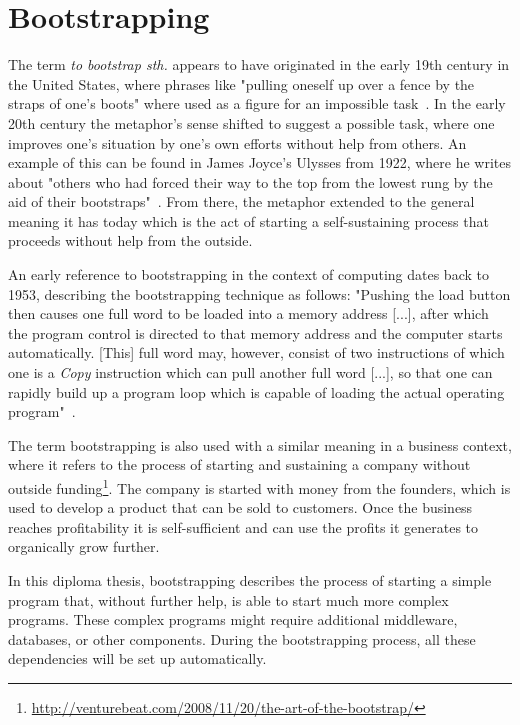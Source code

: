 \section{Bootstrapping}
\label{fundamentals:bootstrapping}

The term \textit{to bootstrap sth.} appears to have originated in the early 19th century in the United States, where phrases like "pulling oneself up over a fence by the straps of one's boots" where used as a figure for an impossible task~\autocite{bootstrap:history}.
In the early 20th century the metaphor's sense shifted to suggest a possible task, where one improves one's situation by one's own efforts without help from others.
An example of this can be found in James Joyce's Ulysses from 1922, where he writes about "others who had forced their way to the top from the lowest rung by the aid of their bootstraps"~\autocite{bootstrap:ulysses}.
From there, the metaphor extended to the general meaning it has today which is the act of starting a self-sustaining process that proceeds without help from the outside.

An early reference to bootstrapping in the context of computing dates back to 1953, describing the bootstrapping technique as follows: "Pushing the load button then causes one full word to be loaded into a memory address [...], after which the program control is directed to that memory address and the computer starts automatically. [This] full word may, however, consist of two instructions of which one is a \textit{Copy} instruction which can pull another full word [...], so that one can rapidly build up a program loop which is capable of loading the actual operating program"~\autocite{bootstrap:early}.

The term bootstrapping is also used with a similar meaning in a business context, where it refers to the process of starting and sustaining a company without outside funding\footnote{\url{http://venturebeat.com/2008/11/20/the-art-of-the-bootstrap/}}.
The company is started with money from the founders, which is used to develop a product that can be sold to customers.
Once the business reaches profitability it is self-sufficient and can use the profits it generates to organically grow further.

In this diploma thesis, bootstrapping describes the process of starting a simple program that, without further help, is able to start much more complex programs.
These complex programs might require additional middleware, databases, or other components.
During the bootstrapping process, all these dependencies will be set up automatically.
